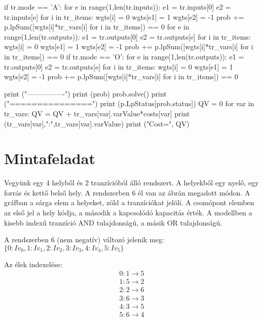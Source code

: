 \begin{python}
            if tr.mode == 'A':
                for e in range(1,len(tr.inputs)):
                    e1 = tr.inputs[0]
                    e2 = tr.inputs[e]
                    for i in tr_items:
                        wgts[i] = 0
                    wgts[e1] =  1
                    wgts[e2] =  -1
                    prob += p.lpSum([wgts[i]*tr_vars[i] for i in tr_items]) == 0
                for e in range(1,len(tr.outputs)):
                    e1 = tr.outputs[0]
                    e2 = tr.outputs[e]
                    for i in tr_items:
                        wgts[i] = 0
                    wgts[e1] =  1
                    wgts[e2] =  -1
                    prob += p.lpSum([wgts[i]*tr_vars[i] for i in tr_items]) == 0
            if tr.mode == 'O':
                for e in range(1,len(tr.outputs)):
                    e1 = tr.outputs[0]
                    e2 = tr.outputs[e]
                    for i in tr_items:
                        wgts[i] = 0
                    wgts[e1] =  1
                    wgts[e2] =  -1
                    prob += p.lpSum([wgts[i]*tr_vars[i] for i in tr_items]) == 0
                    
            
        print ("----------------")
        print (prob)
        prob.solve()
        print ("===============")
        print (p.LpStatus[prob.status])
        QV = 0
        for var in tr_vars:
            QV = QV + tr_vars[var].varValue*costs[var]
            print (tr_vars[var],":",tr_vars[var].varValue)
        print ("Cost=", QV)
\end{python}

\section{Mintafeladat}

Vegyünk egy 4 helyből és 2 tranzícióból álló rendszert. A helyekből egy nyelő, egy forrás és kettő belső hely. A rendszerben 6 él van az ábrán megadott módon.  A gráfban a sárga elem a helyeket, zöld a tranzíciókat jelöli. A csomópont elemben az első jel a hely kódja, a második a kapcsolódó kapacitás érték. A modellben a kisebb indexű tranzíció AND tulajdonságú, a másik OR tulajdonságú. 

A rendszerben 6 (nem negatív) változó jelenik meg:  $\{0: Iv_0, 1: Iv_1, 2: Iv_2, 3: Iv_3, 4: Iv_4, 5: Iv_5\}$

Az élek indexelése:
\begin{align*}
0  :  1 \rightarrow 5  \\
1  :  5 \rightarrow 2  \\
2  :  2 \rightarrow 6  \\
3  :  6 \rightarrow 3  \\
4  :  3 \rightarrow 5  \\
5  :  6 \rightarrow 4 
\end{align*}

